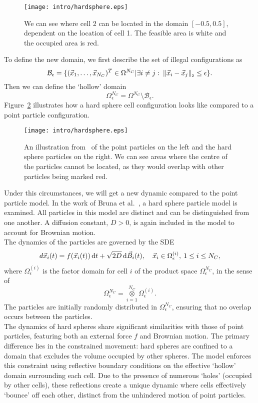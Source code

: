 \begin{figure}[h!]
	\centering
	\texttt{[image: intro/hardsphere.eps]}
	\caption{We can see where cell 2 can be located in the domain $[-0.5, 0.5]$, dependent on the location of cell 1. 
	The feasible area is white and the occupied area is red.  %
	}
	\label{fig:exclusion1d}
\end{figure}

To define the new domain, we first describe the set of illegal configurations as
\[
	\mathcal{B}_{\epsilon} = \{(\vec{x}_1, \ldots, \vec{x}_{N_C})^T \in \Omega^{N_C} | \exists i \neq j: \: \norm[\vec{x}_i - \vec{x}_j] \leq \epsilon\}.
\]
Then we can define the `hollow' domain 
\[
	\Omega_{\epsilon}^{N_C} = \Omega^{N_C} \setminus \mathcal{B}_{\epsilon}.
\]
Figure~\ref{fig:hardsphere} illustrates how a hard sphere cell configuration looks like compared to a point particle configuration. \\



\begin{figure}[h!]
	\centering
	\texttt{[image: intro/hardsphere.eps]}
	\caption{An illustration from~\cite{Bruna2012} of the point particles on the left and the hard sphere particles on the right. We can see areas where the centre of the particles cannot be located, as they would overlap with other particles being marked red. 
	}
	\label{fig:hardsphere}
\end{figure}

Under this circumstances, we will get a new dynamic compared to the point particle model.  
In the work of Bruna et al.~\cite{Bruna2012}, a hard sphere particle model is examined.
All particles in this model are distinct and can be distinguished from one another. 
A diffusion constant, $D>0$, is again included in the model to account for Brownian motion. \\
The dynamics of the particles are governed by the SDE
\begin{align*}
	d\vec{x}_i(t) = f(\vec{x}_i(t)) \, \mathrm{d} t + \sqrt{2D} \, \mathrm{d} \vec{B}_i(t), \quad \vec{x}_i \in \Omega_{\epsilon}^{(i)}, \: 1 \leq i \leq N_C,
\end{align*}
where $\Omega_{\epsilon}^{(i)}$ is the factor domain for cell $i$ of the product space $\Omega_{\epsilon}^{N_C}$, in the sense of 
\[
	\Omega_{\epsilon}^{N_C} =  \mathop{\otimes}\limits_{i=1}^{N_C} \Omega_{\epsilon}^{(i)}. 
\]
The particles are initially randomly distributed in $\Omega^{N_C}_{\epsilon}$, ensuring that no overlap occurs between the particles. \\
The dynamics of hard spheres share significant similarities with those of point particles, featuring both an external force $f$ and Brownian motion. 
The primary difference lies in the constrained movement: hard spheres are confined to a domain that excludes the volume occupied by other spheres. 
The model enforces this constraint using reflective boundary conditions on the effective `hollow' domain surrounding each cell. 
Due to the presence of numerous `holes' (occupied by other cells), these reflections create a unique dynamic where cells effectively `bounce' off each other, distinct from the unhindered motion of point particles. 


